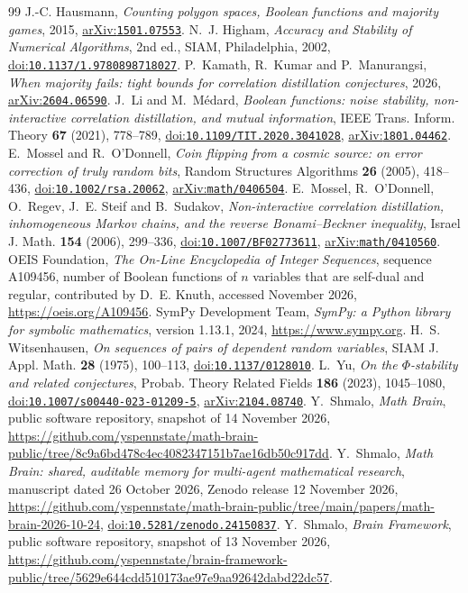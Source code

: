 \documentclass[11pt]{amsart}
\theoremstyle{remark}
\newcommand{\doi}[1]{\href{https://doi.org/#1}{doi:\nolinkurl{#1}}}
\newcommand{\arxiv}[1]{\href{https://arxiv.org/abs/#1}{arXiv:\nolinkurl{#1}}}
\begin{document}
\begin{thebibliography}{99}
 J.-C. Hausmann, \emph{Counting polygon spaces, Boolean functions and majority games}, 2015,
\arxiv{1501.07553}.
 N.~J. Higham, \emph{Accuracy and Stability of Numerical Algorithms}, 2nd ed., SIAM, Philadelphia,
2002, \doi{10.1137/1.9780898718027}.
 P.~Kamath, R.~Kumar and P.~Manurangsi, \emph{When majority fails: tight bounds for correlation
distillation conjectures}, 2026, \arxiv{2604.06590}.
 J.~Li and M.~M\'edard, \emph{Boolean functions: noise stability, non-interactive correlation
distillation, and mutual information}, IEEE Trans. Inform. Theory \textbf{67} (2021), 778--789,
\doi{10.1109/TIT.2020.3041028}, \arxiv{1801.04462}.
 E.~Mossel and R.~O'Donnell, \emph{Coin flipping from a cosmic source: on error correction of truly
random bits}, Random Structures Algorithms \textbf{26} (2005), 418--436, \doi{10.1002/rsa.20062}, \arxiv{math/0406504}.
 E.~Mossel, R.~O'Donnell, O.~Regev, J.~E. Steif and B.~Sudakov, \emph{Non-interactive correlation
distillation, inhomogeneous Markov chains, and the reverse Bonami--Beckner inequality}, Israel J. Math. \textbf{154}
(2006), 299--336, \doi{10.1007/BF02773611}, \arxiv{math/0410560}.
 OEIS Foundation, \emph{The On-Line Encyclopedia of Integer Sequences}, sequence A109456, number of
Boolean functions of $n$ variables that are self-dual and regular, contributed by D.~E. Knuth, accessed November 2026,
\url{https://oeis.org/A109456}.
 SymPy Development Team, \emph{SymPy: a Python library for symbolic mathematics}, version 1.13.1, 2024,
\url{https://www.sympy.org}.
 H.~S. Witsenhausen, \emph{On sequences of pairs of dependent random variables}, SIAM J. Appl. Math.
\textbf{28} (1975), 100--113, \doi{10.1137/0128010}.
 L.~Yu, \emph{On the $\Phi$-stability and related conjectures}, Probab. Theory Related Fields
\textbf{186} (2023), 1045--1080, \doi{10.1007/s00440-023-01209-5}, \arxiv{2104.08740}.
 Y.~Shmalo, \emph{Math Brain}, public software repository, snapshot of 14 November 2026,
\url{https://github.com/yspennstate/math-brain-public/tree/8c9a6bd478c4ec4082347151b7ae16db50c917dd}.
 Y.~Shmalo, \emph{Math Brain: shared, auditable memory for multi-agent mathematical research},
manuscript dated 26 October 2026, Zenodo release 12 November 2026,
\url{https://github.com/yspennstate/math-brain-public/tree/main/papers/math-brain-2026-10-24},
\doi{10.5281/zenodo.24150837}.
 Y.~Shmalo, \emph{Brain Framework}, public software repository, snapshot of 13 November 2026,
\url{https://github.com/yspennstate/brain-framework-public/tree/5629e644cdd510173ae97e9aa92642dabd22dc57}.
\end{thebibliography}
\end{document}
